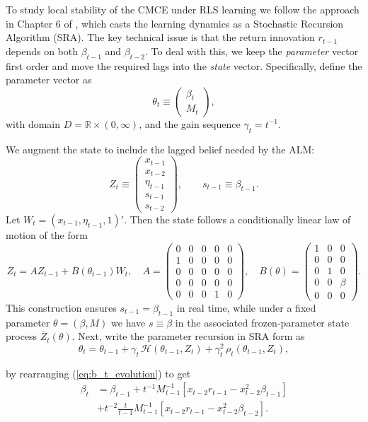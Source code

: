 To study local stability of the CMCE under RLS learning we follow the approach in Chapter 6 of \cite{GeorgeWEvans2001},
which casts the learning dynamics as a Stochastic Recursion Algorithm (SRA).
The key technical issue is that the return innovation $r_{t-1}$ depends on both $\beta_{t-1}$ and $\beta_{t-2}$. 
To deal with this, we keep the \emph{parameter} vector first order and move the required lags into the \emph{state} vector. Specifically, define the parameter vector as
\[
\theta_t \equiv 
\begin{pmatrix}
\beta_t\\
M_t
\end{pmatrix},\]
with domain $D=\mathbb R\times (0,\infty)$, and the gain sequence $\gamma_t=t^{-1}$.

We augment the state to include the lagged belief needed by the ALM:
\[
Z_t \equiv 
\begin{pmatrix}
x_{t-1}\\
x_{t-2}\\
\eta_{t-1}\\
s_{t-1} \\
s_{t-2}
\end{pmatrix},
\qquad s_{t-1}\equiv \beta_{t-1}.
\]
Let $W_t=(x_{t-1},\eta_{t-1},1)'$. Then the state follows a conditionally linear law of motion of the form 
\[
Z_t = A Z_{t-1} + B(\theta_{t-1})W_{t},
\quad
A=
\begin{pmatrix}
0&0&0&0&0\\
1&0&0&0&0\\
0&0&0&0&0\\
0&0&0&0&0\\
0&0&0&1&0
\end{pmatrix},
\quad
B(\theta)=
\begin{pmatrix}
1&0&0\\
0&0&0\\
0&1&0\\
0&0&\beta\\
0&0&0
\end{pmatrix}.
\]
This construction ensures $s_{t-1}=\beta_{t-1}$ in real time, while under a fixed parameter $\theta=(\beta,M)$ we have $s\equiv \beta$ in the associated frozen-parameter state process $\bar Z_t(\theta)$. Next, write the parameter recursion in SRA form as
\[
\theta_t=\theta_{t-1}+\gamma_t\,\mathcal H(\theta_{t-1},Z_t)+\gamma_t^2\,\rho_t(\theta_{t-1},Z_t),
\]

by rearranging (\ref{eq:b_t_evolution}) to get
\begin{equation}
    \begin{aligned}
        \beta_t & = \beta_{t-1} + t^{-1} M^{-1}_{t-1} \left[ x_{t-2} r_{t-1} - x_{t-2}^2 \beta_{t-1} \right] \\
        & + t^{-2} \frac{t}{t-1} M^{-1}_{t-1} \left[ x_{t-2} r_{t-1} - x_{t-2}^2 \beta_{t-2} \right].
    \end{aligned}
\end{equation}

